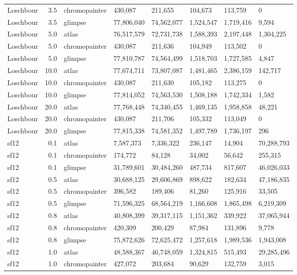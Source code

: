 {\begin{longtable}[t]{lrllllll}
Loschbour & 3.5 & chromopainter & 430,087 & 211,655 & 104,673 & 113,759 & 0\\
Loschbour & 3.5 & glimpse & 77,806,040 & 74,562,077 & 1,524,547 & 1,719,416 & 9,594\\
Loschbour & 5.0 & atlas & 76,517,579 & 72,731,738 & 1,588,393 & 2,197,448 & 1,304,225\\
Loschbour & 5.0 & chromopainter & 430,087 & 211,636 & 104,949 & 113,502 & 0\\
Loschbour & 5.0 & glimpse & 77,810,787 & 74,564,499 & 1,518,703 & 1,727,585 & 4,847\\
Loschbour & 10.0 & atlas & 77,674,711 & 73,807,087 & 1,481,465 & 2,386,159 & 142,717\\
Loschbour & 10.0 & chromopainter & 430,087 & 211,630 & 105,182 & 113,275 & 0\\
Loschbour & 10.0 & glimpse & 77,814,052 & 74,563,530 & 1,508,188 & 1,742,334 & 1,582\\
Loschbour & 20.0 & atlas & 77,768,448 & 74,340,455 & 1,469,135 & 1,958,858 & 48,221\\
Loschbour & 20.0 & chromopainter & 430,087 & 211,706 & 105,332 & 113,049 & 0\\
Loschbour & 20.0 & glimpse & 77,815,338 & 74,581,352 & 1,497,789 & 1,736,197 & 296\\
sf12 & 0.1 & atlas & 7,587,373 & 7,336,322 & 236,147 & 14,904 & 70,288,793\\
sf12 & 0.1 & chromopainter & 174,772 & 84,128 & 34,002 & 56,642 & 255,315\\
sf12 & 0.1 & glimpse & 31,789,601 & 30,484,260 & 487,734 & 817,607 & 46,026,033\\
sf12 & 0.5 & atlas & 30,688,125 & 29,606,869 & 898,622 & 182,634 & 47,186,835\\
sf12 & 0.5 & chromopainter & 396,582 & 189,406 & 81,260 & 125,916 & 33,505\\
sf12 & 0.5 & glimpse & 71,596,325 & 68,564,219 & 1,166,608 & 1,865,498 & 6,219,309\\
sf12 & 0.8 & atlas & 40,808,399 & 39,317,115 & 1,151,362 & 339,922 & 37,065,944\\
sf12 & 0.8 & chromopainter & 420,309 & 200,429 & 87,984 & 131,896 & 9,778\\
sf12 & 0.8 & glimpse & 75,872,626 & 72,625,472 & 1,257,618 & 1,989,536 & 1,943,008\\
sf12 & 1.0 & atlas & 48,588,367 & 46,748,059 & 1,324,815 & 515,493 & 29,285,496\\
sf12 & 1.0 & chromopainter & 427,072 & 203,684 & 90,629 & 132,759 & 3,015\\

\end{longtable}}
